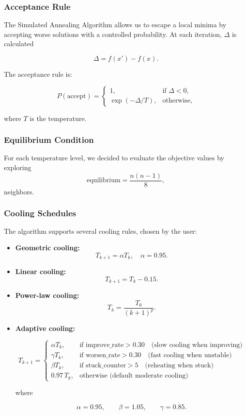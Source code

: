 \documentclass[12pt]{article}
\begin{document}
\subsubsection{Acceptance Rule}

The Simulated Annealing Algorithm allows us to escape a local minima by accepting worse solutions with a controlled probability.  
At each iteration, ${\Delta}$ is calculated

\[
    \Delta = f(x') - f(x).
\]

The acceptance rule is:

\[
    P(\text{accept}) =
    \begin{cases}
        1,               & \text{if } \Delta < 0, \\
        \exp(-\Delta/T), & \text{otherwise},
    \end{cases}
\]

where $T$ is the temperature.

\subsubsection{Equilibrium Condition}

For each temperature level, we decided to evaluate the objective values by exploring 
\[
    \text{equilibrium} = \frac{n(n-1)}{8},
\]
neighbors.

\subsubsection{Cooling Schedules}

The algorithm supports several cooling rules, chosen by the user:

\begin{itemize}
    \item \textbf{Geometric cooling:}
    \[
        T_{k+1} = \alpha T_k, \quad \alpha = 0.95.
    \]

    \item \textbf{Linear cooling:}
    \[
        T_{k+1} = T_k - 0.15.
    \]

    \item \textbf{Power-law cooling:}
    \[
        T_k = \frac{T_0}{(k+1)^p}.
    \]

    \item \textbf{Adaptive cooling:}

    \[
    T_{k+1} =
    \begin{cases}
    \alpha T_k, & \text{if improve\_rate} > 0.30 \quad \text{(slow cooling when improving)} \\[6pt]
    \gamma T_k, & \text{if worsen\_rate} > 0.30 \quad \text{(fast cooling when unstable)} \\[6pt]
    \beta T_k, & \text{if stuck\_counter} > 5 \quad \text{(reheating when stuck)} \\[6pt]
    0.97\, T_k, & \text{otherwise (default moderate cooling)} 
    \end{cases}
    \]
    
    where
    
    \[
    \alpha = 0.95, \qquad
    \beta = 1.05, \qquad
    \gamma = 0.85.
    \]
\end{itemize}
\end{document}
